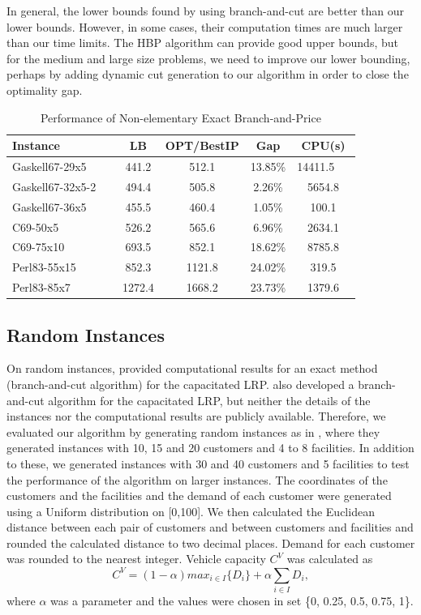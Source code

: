 In general, the lower bounds found by using branch-and-cut \citep{Barreto04} 
are better than our lower bounds. However, in some
cases, their computation times are much larger than our time limits.
The HBP algorithm can provide good upper bounds, but for the medium
and large size problems, we need to improve our lower bounding,
perhaps by adding dynamic cut generation to our algorithm in order to
close the optimality gap.
\begin{table}[ht]
\centering
\caption{Performance of Non-elementary Exact Branch-and-Price}\label{brt-gr3}
\begin {tabular}[t]{|l|c|c|c|c|}  
\hline
Instance	        &       LB	&	OPT/BestIP &	Gap    & CPU(s)\\\hline
Gaskell67-29x5 	&	441.2	&	512.1	&	13.85\%	&	14411.5	\ \ \\
Gaskell67-32x5-2 \ \	&	494.4	&	505.8	&	2.26\%	&	5654.8	\\
Gaskell67-36x5 	&	455.5	&	460.4	&	1.05\%	&	100.1\\
C69-50x5 	&	526.2	&	565.6	&	6.96\%	&	2634.1\\
C69-75x10 	&	693.5	&	852.1	&	18.62\%	&	8785.8\\
Perl83-55x15 	&	852.3	&	1121.8	&	24.02\%	&	319.5\\
Perl83-85x7 	&	1272.4	&	1668.2	&	23.73\%	&	1379.6\\
\hline
\end{tabular}
\end{table}

\subsection{Random Instances}
On random instances, \citet{Laporte86} provided computational results
for an exact method (branch-and-cut algorithm) for the capacitated
LRP.
\citet{Belenguer} also developed a branch-and-cut algorithm for the
capacitated LRP, but neither the details of the instances nor the
computational results are publicly available. Therefore, we evaluated
our algorithm by generating random instances as in \citet{Laporte86},
where they generated instances with 10, 15 and 20 customers and 4 to 8
facilities. In addition to these, we generated instances with 30 and
40 customers and 5 facilities to test the performance of the algorithm
on larger instances. The coordinates of the customers and the
facilities and the demand of each customer were generated using a
Uniform distribution on [0,100]. We then calculated the Euclidean
distance between each pair of customers and between customers and
facilities and rounded the calculated distance to two decimal places.
Demand for each customer was rounded to the nearest integer. Vehicle
capacity $C^V$ was calculated as
\begin{equation}
C^V = (1-\alpha) max_{i \in I}\{D_i\} + \alpha \sum_{i \in I}D_i,
\end{equation}   
where $\alpha$ was a parameter and the  values were chosen in set \{0,
0.25, 0.5, 0.75, 1\}.  

